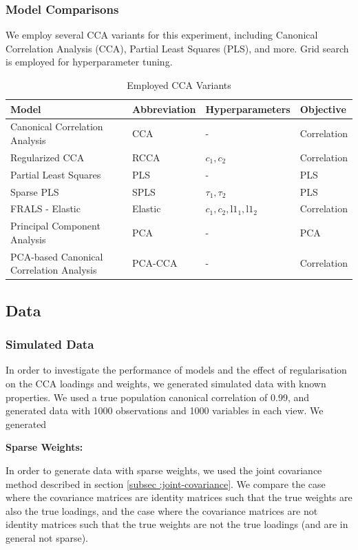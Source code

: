 \subsubsection{Model Comparisons}
We employ several CCA variants for this experiment, including Canonical Correlation Analysis (CCA), Partial Least Squares (PLS), and more.
Grid search is employed for hyperparameter tuning.

\begin{table}[h]
\centering
\caption{Employed CCA Variants}
\begin{tabular}{|l|l|l|l|}
\hline
\textbf{Model} & \textbf{Abbreviation} & \textbf{Hyperparameters} & \textbf{Objective} \\
\hline
Canonical Correlation Analysis & CCA & - & Correlation \\
\hline
Regularized CCA & RCCA & \(c_1, c_2\) & Correlation \\
\hline
Partial Least Squares & PLS & - & PLS \\
\hline
Sparse PLS & SPLS & \(\tau_1, \tau_2\) & PLS \\
\hline
FRALS - Elastic & Elastic & \(c_1, c_2, \text{l1}_1, \text{l1}_2\) & Correlation \\
\hline
Principal Component Analysis & PCA & - & PCA \\
\hline
PCA-based Canonical Correlation Analysis & PCA-CCA & - & Correlation \\
\hline
\end{tabular}
\label{table:cca-variants}
\end{table}

\subsection{Data}

\subsubsection{Simulated Data}

In order to investigate the performance of models and the effect of regularisation on the CCA loadings and weights,
we generated simulated data with known properties. We used a true population canonical correlation of 0.99, and
generated data with 1000 observations and 1000 variables in each view. We generated

\textbf{Sparse Weights:}

In order to generate data with sparse weights, we used the joint covariance method described in section \ref{subsec
:joint-covariance}. We compare the case where the covariance matrices are identity matrices such that the true weights
are also the true loadings, and the case where the covariance matrices are not identity matrices such that the true
weights are not the true loadings (and are in general not sparse).

